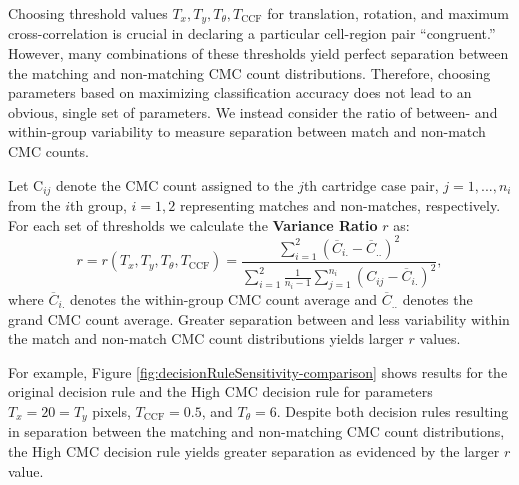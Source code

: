 \documentclass[11pt,]{isuthesis}
\begin{document}
Choosing threshold values \(T_x, T_y, T_\theta, T_{\text{CCF}}\) for translation, rotation, and maximum cross-correlation is crucial in declaring a particular cell-region pair ``congruent.''
However, many combinations of these thresholds yield perfect separation between the matching and non-matching CMC count distributions.
Therefore, choosing parameters based on maximizing classification accuracy does not lead to an obvious, single set of parameters.
We instead consider the ratio of between- and within-group variability to measure separation between match and non-match CMC counts.

Let C\(_{ij}\) denote the CMC count assigned to the \(j\)th cartridge case pair, \(j = 1,...,n_i\) from the \(i\)th group, \(i = 1,2\) representing matches and non-matches, respectively.
For each set of thresholds we calculate the \textbf{Variance Ratio} \(r\) as:
\[
r = r\left(T_x, T_y, T_\theta, T_{\text{CCF}}\right) = \frac{\sum_{i=1}^2 \left(\overline{C}_{i.} - \overline{C}_{..}\right)^2}{\sum_{i=1}^2 \frac{1}{n_i - 1}\sum_{j=1}^{n_i} \left(C_{ij} - \overline{C}_{i.}\right)^2},
\]
where \(\overline{C}_{i.}\) denotes the within-group CMC count average and \(\overline{C}_{..}\) denotes the grand CMC count average.
Greater separation between and less variability within the match and non-match CMC count distributions yields larger \(r\) values.

For example, Figure \ref{fig:decisionRuleSensitivity-comparison} shows results for the original decision rule and the High CMC decision rule for parameters \(T_x = 20 = T_y\) pixels, \(T_{\text{CCF}} = 0.5\), and \(T_{\theta} = 6\).
Despite both decision rules resulting in separation between the matching and non-matching CMC count distributions, the High CMC decision rule yields greater separation as evidenced by the larger \(r\) value.
\end{document}
